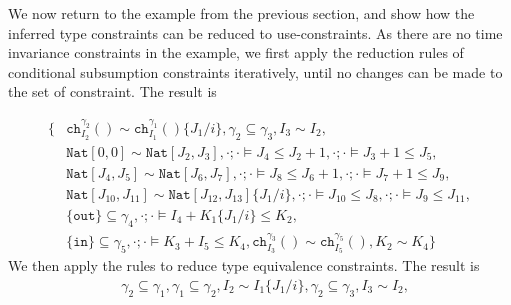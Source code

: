 %
\begin{exmp}\label{examp:consredu}
We now return to the example from the previous section, and show how the inferred type constraints can be reduced to use-constraints. As there are no time invariance constraints in the example, we first apply the reduction rules of conditional subsumption constraints iteratively, until no changes can be made to the set of constraint. The result is

\begin{align*}
    \{&\texttt{ch}^{\gamma_2}_{I_2}()\sim\texttt{ch}^{\gamma_1}_{I_1}()\{J_1/i\},
    \gamma_2 \subseteq \gamma_3, I_3\sim I_2,\\
    &\texttt{Nat}[0,0] \sim \texttt{Nat}[J_2,J_3],
    \cdot;\cdot\vDash J_4 \leq J_2+1, \cdot;\cdot\vDash J_3+1 \leq J_5 ,\\
    &\texttt{Nat}[J_4,J_5] \sim \texttt{Nat}[J_6,J_7], 
    \cdot;\cdot\vDash J_8 \leq J_6+1,\cdot;\cdot\vDash J_7+1 \leq J_9,\\
    &  \texttt{Nat}[J_{10},J_{11}] \sim \texttt{Nat}[J_{12},J_{13}]\{J_1/i\},
    \cdot;\cdot\vDash J_{10} \leq J_8, \cdot;\cdot\vDash J_9 \leq J_{11} , \\
    & \{\texttt{out}\} \subseteq \gamma_4,
    \cdot;\cdot\vDash I_4 + K_1\{J_1/i\} \leq K_2,\\
    & \{\texttt{in}\} \subseteq \gamma_5,\cdot;\cdot\vDash K_3 + I_5 \leq K_4,\texttt{ch}^{\gamma_3}_{I_3}() \sim \texttt{ch}^{\gamma_5}_{I_5}(),K_2 \sim K_4\}
\end{align*}
%
We then apply the rules to reduce type equivalence constraints. The result is
%
\begin{align*}
    &\gamma_2 \subseteq \gamma_1, \gamma_1 \subseteq \gamma_2, I_2 \sim I_1\{J_1/i\},\gamma_2 \subseteq \gamma_3, I_3\sim I_2,\\

\end{align*}
\end{exmp}
